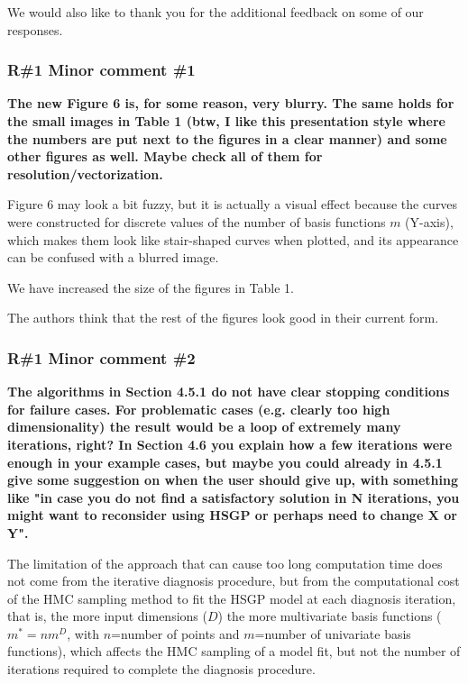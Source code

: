 \documentclass[11pt]{report}
\begin{document}
We would also like to thank you for the additional feedback on some of our responses.

\subsubsection*{R\#1 Minor comment \#1}

\textbf{The new Figure 6 is, for some reason, very blurry. The same holds for the small images in Table 1 (btw, I like this presentation style where the numbers are put next to the figures in a clear manner) and some other figures as well. Maybe check all of them for resolution/vectorization.}

Figure 6 may look a bit fuzzy, but it is actually a visual effect because the curves were constructed for discrete values of the number of basis functions $m$ (Y-axis), which makes them look like stair-shaped curves when plotted, and its appearance can be confused with a blurred image.

We have increased the size of the figures in Table 1.

The authors think that the rest of the figures look good in their current form.


\subsubsection*{R\#1 Minor comment \#2}

\textbf{The algorithms in Section 4.5.1 do not have clear stopping conditions for failure cases.  For problematic cases (e.g. clearly too high dimensionality) the result would be a loop of  extremely many iterations, right? In Section 4.6 you explain how a few iterations were enough in your example cases, but maybe you could already in 4.5.1 give some suggestion on when the user should give up, with something like "in case you do not find a satisfactory solution in N iterations, you might want to reconsider using HSGP or perhaps need to change X or Y".}

The limitation of the approach that can cause too long computation time does not come from the iterative diagnosis procedure, but from the computational cost of the HMC sampling method to fit the HSGP model at each diagnosis iteration, that is, the more input dimensions ($D$) the more multivariate basis functions ($m^*=nm^D$, with $n$=number of points and $m$=number of univariate basis functions), which affects the HMC sampling of a model fit, but not the number of iterations required to complete the diagnosis procedure.
\end{document}
